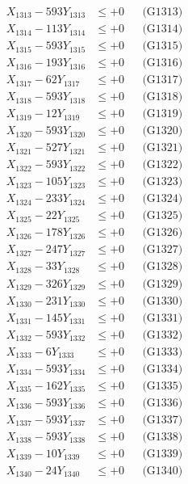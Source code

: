 \documentclass[a4paper,10pt]{article}
\begin{document}
{\begin{align}
X_{1313} - 593Y_{1313} &\leq +0 && \text{(G1313)} \\
X_{1314} - 113Y_{1314} &\leq +0 && \text{(G1314)} \\
X_{1315} - 593Y_{1315} &\leq +0 && \text{(G1315)} \\
X_{1316} - 193Y_{1316} &\leq +0 && \text{(G1316)} \\
X_{1317} - 62Y_{1317} &\leq +0 && \text{(G1317)} \\
X_{1318} - 593Y_{1318} &\leq +0 && \text{(G1318)} \\
X_{1319} - 12Y_{1319} &\leq +0 && \text{(G1319)} \\
X_{1320} - 593Y_{1320} &\leq +0 && \text{(G1320)} \\
\allowbreak
X_{1321} - 527Y_{1321} &\leq +0 && \text{(G1321)} \\
X_{1322} - 593Y_{1322} &\leq +0 && \text{(G1322)} \\
X_{1323} - 105Y_{1323} &\leq +0 && \text{(G1323)} \\
X_{1324} - 233Y_{1324} &\leq +0 && \text{(G1324)} \\
X_{1325} - 22Y_{1325} &\leq +0 && \text{(G1325)} \\
X_{1326} - 178Y_{1326} &\leq +0 && \text{(G1326)} \\
X_{1327} - 247Y_{1327} &\leq +0 && \text{(G1327)} \\
X_{1328} - 33Y_{1328} &\leq +0 && \text{(G1328)} \\
X_{1329} - 326Y_{1329} &\leq +0 && \text{(G1329)} \\
X_{1330} - 231Y_{1330} &\leq +0 && \text{(G1330)} \\
\allowbreak
X_{1331} - 145Y_{1331} &\leq +0 && \text{(G1331)} \\
X_{1332} - 593Y_{1332} &\leq +0 && \text{(G1332)} \\
X_{1333} - 6Y_{1333} &\leq +0 && \text{(G1333)} \\
X_{1334} - 593Y_{1334} &\leq +0 && \text{(G1334)} \\
X_{1335} - 162Y_{1335} &\leq +0 && \text{(G1335)} \\
X_{1336} - 593Y_{1336} &\leq +0 && \text{(G1336)} \\
X_{1337} - 593Y_{1337} &\leq +0 && \text{(G1337)} \\
X_{1338} - 593Y_{1338} &\leq +0 && \text{(G1338)} \\
X_{1339} - 10Y_{1339} &\leq +0 && \text{(G1339)} \\
X_{1340} - 24Y_{1340} &\leq +0 && \text{(G1340)} \\

\end{align}}
\end{document}

